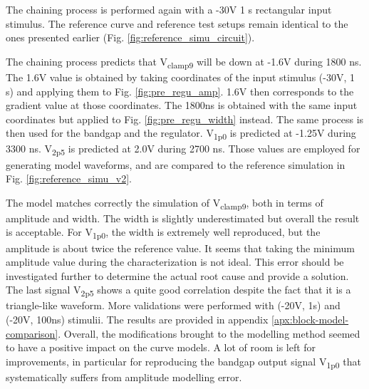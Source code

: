 The chaining process is performed again with a -30V 1 \textmu{}s rectangular input stimulus.
The reference curve and reference test setups remain identical to the ones presented earlier (Fig. \ref{fig:reference_simu_circuit}).

The chaining process predicts that V\textsubscript{clamp9} will be down at -1.6V during 1800 ns.
The 1.6V value is obtained by taking coordinates of the input stimulus (-30V, 1 \textmu{}s) and applying them to Fig. \ref{fig:pre_regu_amp}.
1.6V then corresponds to the gradient value at those coordinates.
The 1800ns is obtained with the same input coordinates but applied to Fig. \ref{fig:pre_regu_width} instead.
The same process is then used for the bandgap and the regulator.
V\textsubscript{1p0} is predicted at -1.25V during 3300 ns.
V\textsubscript{2p5} is predicted at 2.0V during 2700 ns.
Those values are employed for generating model waveforms, and are compared to the reference simulation in Fig. \ref{fig:reference_simu_v2}.

The model matches correctly the simulation of V\textsubscript{clamp9}, both in terms of amplitude and width.
The width is slightly underestimated but overall the result is acceptable.
For V\textsubscript{1p0}, the width is extremely well reproduced, but the amplitude is about twice the reference value.
It seems that taking the minimum amplitude value during the characterization is not ideal.
This error should be investigated further to determine the actual root cause and provide a solution.
The last signal V\textsubscript{2p5} shows a quite good correlation despite the fact that it is a triangle-like waveform.
More validations were performed with (-20V, 1\textmu{}s) and (-20V, 100ns) stimulii.
The results are provided in appendix \ref{apx:block-model-comparison}.
Overall, the modifications brought to the modelling method seemed to have a positive impact on the curve models.
A lot of room is left for improvements, in particular for reproducing the bandgap output signal V\textsubscript{1p0} that systematically suffers from amplitude modelling error.


